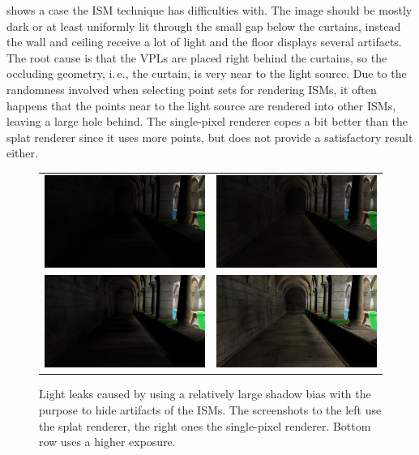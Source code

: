  shows a case the ISM technique has difficulties with. The image should be mostly dark or at least uniformly lit through the small gap below the curtains, instead the wall and ceiling receive a lot of light and the floor displays several artifacts. The root cause is that the VPLs are placed right behind the curtains, so the occluding geometry, i.\,e., the curtain, is very near to the light source. Due to the randomness involved when selecting point sets for rendering ISMs, it often happens that the points near to the light source are rendered into other ISMs, leaving a large hole behind. The single-pixel renderer copes a bit better than the splat renderer since it uses more points, but does not provide a satisfactory result either.



\begin{figure}[htb]
\centering
  \begin{tabular}{@{}cc@{}}
    \includegraphics[width=.48\textwidth]{screenshots/bias_splat} &
    \includegraphics[width=.48\textwidth]{screenshots/bias_single_pixel}\\
      \includegraphics[width=.48\textwidth]{screenshots/bias_splat_exposure} &
      \includegraphics[width=.48\textwidth]{screenshots/bias_single_pixel_exposure}
  \end{tabular}
  \caption{Light leaks caused by using a relatively large shadow bias with the purpose to hide artifacts of the ISMs. The screenshots to the left use the splat renderer, the right ones the single-pixel renderer. Bottom row uses a higher exposure.}
  \label{fig:results:bias}
\end{figure}

